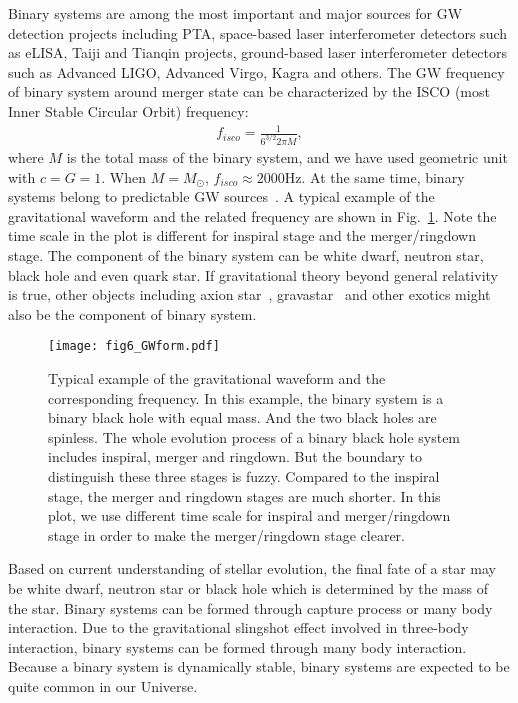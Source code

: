 \documentclass[a4paper,11pt]{article}
\begin{document}
Binary systems are among the most important and major sources for GW detection projects including PTA, space-based laser interferometer detectors such as eLISA, Taiji and Tianqin projects, ground-based laser interferometer detectors such as Advanced LIGO, Advanced Virgo, Kagra and others. The GW frequency of binary system around merger state can be characterized by the ISCO (most Inner Stable Circular Orbit) frequency:
\begin{align}
f_{isco}=\frac{1}{6^{3/2}2\pi M},
\end{align}
where $M$ is the total mass of the binary system, and we have used geometric unit with $c=G=1$. When $M=M_\odot$, $f_{isco}\approx2000$Hz. At the same time, binary systems belong to predictable GW sources~\cite{cai2016gravitational}. A typical example of the gravitational waveform and the related frequency are shown in Fig.~\ref{fig:GWform}. Note the time scale in the plot is different for inspiral stage and the merger/ringdown stage. The component of the binary system can be white dwarf, neutron star, black hole and even quark star. If gravitational theory beyond general relativity is true, other objects including axion star~\cite{Raby:2016deh}, gravastar~\cite{Visser:2003ge} and other exotics might also be the component of binary system.

\begin{figure}
  \centering
  \texttt{[image: fig6\_GWform.pdf]}
  \caption{Typical example of the gravitational waveform and the corresponding frequency. In this example, the binary system is a binary black hole with equal mass. And the two black holes are spinless. The whole evolution process of a binary black hole system includes inspiral, merger and ringdown. But the boundary to distinguish these three stages is fuzzy. Compared to the inspiral stage, the merger and ringdown stages are much shorter. In this plot, we use different time scale for inspiral and merger/ringdown stage in order to make the merger/ringdown stage clearer.}\label{fig:GWform}
\end{figure}

Based on current understanding of stellar evolution, the final fate of a star may be white dwarf, neutron star or black hole which is determined by the mass of the star. Binary systems can be formed through capture process or many body interaction. Due to the gravitational slingshot effect involved in three-body interaction, binary systems can be formed through many body interaction. Because a binary system is dynamically stable,  binary systems are expected to be quite common in our Universe.
\end{document}
